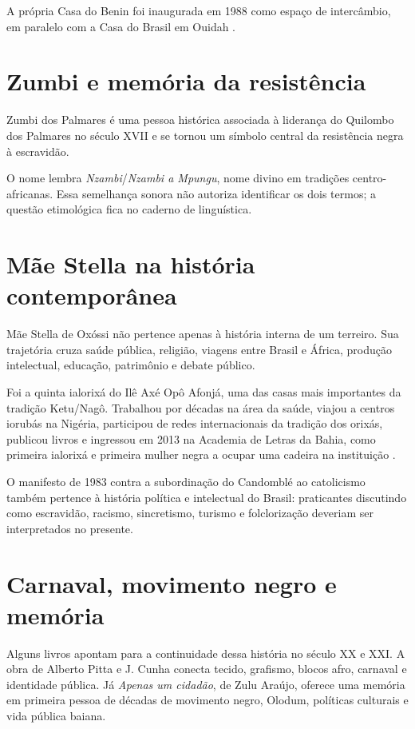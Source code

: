 A própria Casa do Benin foi inaugurada em
1988 como espaço de intercâmbio, em
paralelo com a Casa do Brasil em Ouidah
\cite{casa-benin-visite}.

\section{Zumbi e memória da resistência}
\label{section-historia-zumbi}

Zumbi dos Palmares é uma pessoa histórica
associada à liderança do Quilombo
dos Palmares no século XVII e se tornou um
símbolo central da resistência
negra à escravidão.

O nome lembra
\emph{Nzambi}/\emph{Nzambi a Mpungu}, nome
divino em tradições centro-africanas. Essa
semelhança sonora não autoriza
identificar os dois termos; a questão
etimológica fica no caderno de
linguística.

\section{Mãe Stella na história
contemporânea}
\label{section-historia-mae-stella}

Mãe Stella de Oxóssi não pertence apenas à
história interna de um terreiro.
Sua trajetória cruza saúde pública, religião,
viagens entre Brasil e África,
produção intelectual, educação, patrimônio e
debate público.

Foi a quinta ialorixá do Ilê Axé Opô Afonjá,
uma das casas mais importantes da
tradição Ketu/Nagô. Trabalhou por décadas na
área da saúde, viajou a centros
iorubás na Nigéria, participou de redes
internacionais da tradição dos
orixás, publicou livros e ingressou em 2013
na Academia de Letras da Bahia,
como primeira ialorixá e primeira mulher
negra a ocupar uma cadeira na
instituição \cite{mae-stella-alb}.

O manifesto de 1983 contra a subordinação do
Candomblé ao catolicismo também
pertence à história política e intelectual do
Brasil: praticantes discutindo
como escravidão, racismo, sincretismo,
turismo e folclorização deveriam ser
interpretados no presente.

\section{Carnaval, movimento negro e memória}
\label{section-movimento-negro-salvador}

Alguns livros apontam
para a continuidade dessa história
no século XX e XXI. A obra de Alberto Pitta e
J. Cunha conecta tecido,
grafismo, blocos afro, carnaval e identidade
pública. Já
\emph{Apenas um cidadão}, de Zulu Araújo,
oferece uma memória em primeira
pessoa de décadas de movimento negro, Olodum,
políticas culturais e vida
pública baiana.

